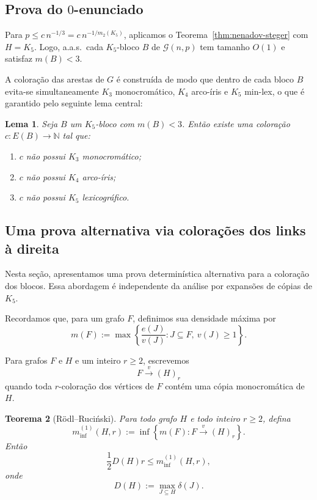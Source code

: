 \documentclass[reqno, 12pt]{amsart}
\numberwithin{equation}{section}
\theoremstyle{plain}
\newtheorem{theorem}{Teorema}[section]
\newtheorem{lemma}[theorem]{Lema}
\theoremstyle{definition}
\newcommand{\Gnp}{\mathcal{G}(n,p)}
\newcommand{\mdens}{m_2}
\newcommand{\maxdens}{m}
\newcommand{\whp}{a.a.s.}
\begin{document}
\subsection{Prova do \texorpdfstring{$0$}{0}-enunciado}

Para $p \le c\, n^{-1/3} = c\, n^{-1/\mdens(K_5)}$, aplicamos o
Teorema~\ref{thm:nenadov-steger} com $H = K_5$. Logo, \whp\ cada $K_5$-bloco
$B$ de $\Gnp$ tem tamanho $O(1)$ e satisfaz $\maxdens(B) < 3$.

A coloração das arestas de $G$ é construída de modo que dentro de cada bloco $B$
evita-se simultaneamente $K_3$ monocromático, $K_4$ arco-íris e $K_5$ min-lex,
o que é garantido pelo seguinte lema central:

\begin{lemma}
  \label{lem:0-statement-K5}
  Seja $B$ um $K_5$-bloco com $\maxdens(B) < 3$.
  Então existe uma coloração $c: E(B) \to \mathbb{N}$ tal que:
  \begin{enumerate}
    \item[(i)] $c$ não possui $K_3$ monocromático;
    \item[(ii)] $c$ não possui $K_4$ arco-íris;
    \item[(iii)] $c$ não possui $K_5$ lexicográfico.
  \end{enumerate}
\end{lemma}

\subsection{Uma prova alternativa via colorações dos links à direita}

Nesta seção, apresentamos uma prova determinística alternativa para a
coloração dos blocos. Essa abordagem é independente da análise por
expansões de cópias de $K_5$.

Recordamos que, para um grafo $F$, definimos sua densidade máxima por
\[
  m(F)
  :=
  \max\left\{
  \frac{e(J)}{v(J)}
  :
  J\subseteq F,\ v(J)\geq 1
  \right\}.
\]

Para grafos $F$ e $H$ e um inteiro $r\geq 2$, escrevemos
\[
  F\xrightarrow{v}(H)_r
\]
quando toda $r$-coloração dos vértices de $F$ contém uma cópia
monocromática de $H$.

\begin{theorem}[Rödl--Ruciński]
  \label{thm:rodl-rucinski-vertex-density}
  Para todo grafo $H$ e todo inteiro $r\geq 2$, defina
  \[
    m_{\inf}^{(1)}(H,r)
    :=
    \inf\left\{
    m(F):
    F\xrightarrow{v}(H)_r
    \right\}.
  \]
  Então
  \[
    \frac{1}{2}D(H)r
    \leq
    m_{\inf}^{(1)}(H,r),
  \]
  onde
  \[
    D(H):=
    \max_{J\subseteq H}\delta(J).
  \]
\end{theorem}
\end{document}
